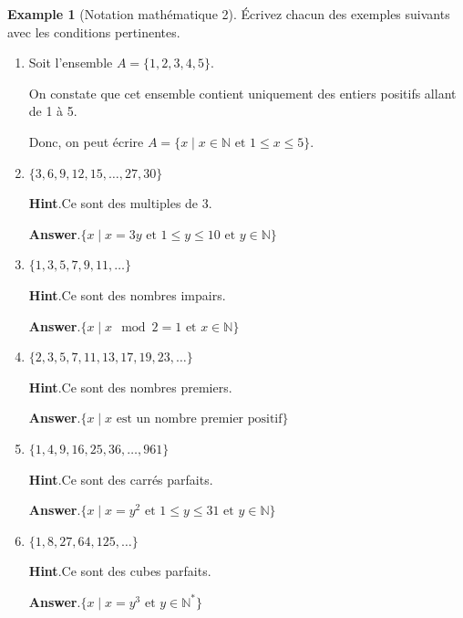 \documentclass{amsart}
\theoremstyle{plain}%
\theoremstyle{definition}%
\newtheorem{example}[theorem]{Example}
\theoremstyle{remark}%
\newcommand{\blocktitlefont}{\relax}
\numberwithin{equation}{section}
\begin{document}
\begin{example}[Notation mathématique 2]\label{example-structured-with-task}%
%
Écrivez chacun des exemples suivants avec les conditions pertinentes.%
\begin{enumerate}[font=\bfseries,label=(\alph*),ref=\alph*]%
\item{}Soit l'ensemble \(A=\lbrace 1,2,3,4,5\rbrace\).%
\par
On constate que cet ensemble contient uniquement des entiers positifs allant de 1 à 5.%
\par
Donc, on peut écrire \(A=\lbrace x\mid x\in\mathbb{N}\text{ et } 1\leq x\leq 5\rbrace\).%
\item{}\(\{3,6,9,12,15,\ldots,27,30\}\)%
\par\smallskip%
\noindent\textbf{\blocktitlefont Hint}.\hypertarget{example-structured-with-task-5-2}{}\quad{}Ce sont des multiples de 3.%
\par\smallskip%
\noindent\textbf{\blocktitlefont Answer}.\hypertarget{example-structured-with-task-5-3}{}\quad{}\(\{x\mid x=3y \text{ et } 1\leq y\leq 10 \text{ et } y\in\mathbb{N}\}\)%
\item{}\(\{1,3,5,7,9,11,\ldots\}\)%
\par\smallskip%
\noindent\textbf{\blocktitlefont Hint}.\hypertarget{example-structured-with-task-6-2}{}\quad{}Ce sont des nombres impairs.%
\par\smallskip%
\noindent\textbf{\blocktitlefont Answer}.\hypertarget{example-structured-with-task-6-3}{}\quad{}\(\{x\mid x\mod 2=1 \text{ et } x\in\mathbb{N}\}\)%
\item{}\(\{2,3,5,7,11,13,17,19,23,\ldots\}\)%
\par\smallskip%
\noindent\textbf{\blocktitlefont Hint}.\hypertarget{example-structured-with-task-7-2}{}\quad{}Ce sont des nombres premiers.%
\par\smallskip%
\noindent\textbf{\blocktitlefont Answer}.\hypertarget{example-structured-with-task-7-3}{}\quad{}\(\{x\mid x\text{ est un nombre premier positif}\}\)%
\item{}\(\{1,4,9,16,25,36,\ldots,961\}\)%
\par\smallskip%
\noindent\textbf{\blocktitlefont Hint}.\hypertarget{example-structured-with-task-8-2}{}\quad{}Ce sont des carrés parfaits.%
\par\smallskip%
\noindent\textbf{\blocktitlefont Answer}.\hypertarget{example-structured-with-task-8-3}{}\quad{}\(\{x\mid x=y^2 \text{ et } 1\leq y\leq 31\text{ et } y\in\mathbb{N}\}\)%
\item{}\(\{1,8,27,64,125,\ldots\}\)%
\par\smallskip%
\noindent\textbf{\blocktitlefont Hint}.\hypertarget{example-structured-with-task-9-2}{}\quad{}Ce sont des cubes parfaits.%
\par\smallskip%
\noindent\textbf{\blocktitlefont Answer}.\hypertarget{example-structured-with-task-9-3}{}\quad{}\(\{x\mid x=y^3 \text{ et } y\in\mathbb{N^*}\}\)%
\end{enumerate}%
\end{example}
\end{document}
